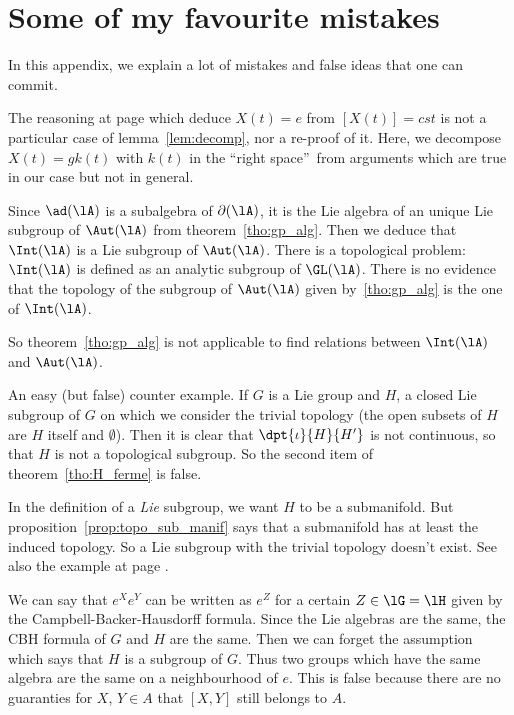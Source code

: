 \section{Some of my favourite mistakes}

In this appendix, we explain a lot of mistakes and false ideas that one can commit.

\begin{erreur}\label{err:decomp}
The reasoning at page \pageref{pg:X_t} which deduce $X(t)=e$ from $[X(t)]=cst$ is not a particular case of lemma~\ref{lem:decomp}, nor a re-proof of it. Here, we decompose $X(t)=gk(t)$ with $k(t)$ in the ``right space''\ from arguments which are true in our case but not in general.
\end{erreur}

\begin{erreur}\label{err:Intt_Aut}
Since $\ad(\lA)$ is a subalgebra of $\partial(\lA)$, it is the Lie algebra of an unique Lie subgroup of $\Aut(\lA)$ from theorem~\ref{tho:gp_alg}. Then we deduce that $\Int(\lA)$ is a Lie subgroup of $\Aut(\lA)$. There is a topological problem: $\Int(\lA)$ is defined as an analytic subgroup of $\GL(\lA)$. There is no evidence that the topology of the subgroup of $\Aut(\lA)$ given by~\ref{tho:gp_alg} is the one of $\Int(\lA)$.

So theorem~\ref{tho:gp_alg} is not applicable to find relations between $\Int(\lA)$ and $\Aut(\lA)$.
\end{erreur}

\begin{erreur}\label{err:gross}
An easy (but false) counter example. If $G$ is a Lie group and $H$, a closed Lie subgroup of $G$ on which we consider the trivial topology (the open subsets of $H$ are $H$ itself and $\emptyset$). Then it is clear that $\dpt{\iota}{H}{H'}$ is not continuous, so that $H$ is not a topological subgroup. So the second item of theorem~\ref{tho:H_ferme} is false.

In the definition of a \emph{Lie} subgroup, we want $H$ to be a submanifold. But proposition~\ref{prop:topo_sub_manif} says that a submanifold has at least the induced topology. So a Lie subgroup with the trivial topology doesn't exist. See also the example at page \pageref{pg:ex_topo_Lie}.
\end{erreur}

\begin{erreur}\label{err:gp_meme_alg}
We can say that $e^Xe^Y$ can be written as $e^Z$ for a certain $Z\in\lG=\lH$ given by the Campbell-Backer-Hausdorff formula. Since the Lie algebras are the same, the CBH formula of $G$ and $H$ are the same. Then we can forget the assumption which says that $H$ is a subgroup of $G$. Thus two groups which have the same algebra are the same on a neighbourhood of $e$. This is false because there are no guaranties for $X$, $Y\in A$ that $[X,Y]$ still belongs to $A$.
\end{erreur}

